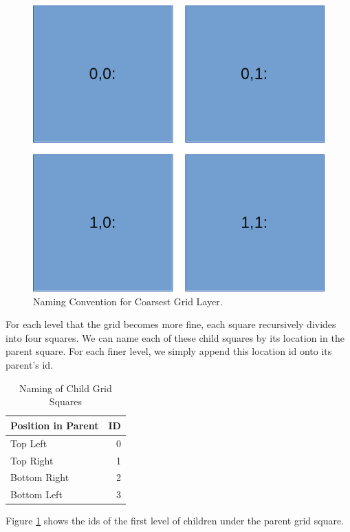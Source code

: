 \begin{figure}[htbp]
	\centering
	\includegraphics[width=0.6\columnwidth]{img/grid-sq.png}
	\caption{Naming Convention for Coarsest Grid Layer.}
	\label{fig:coarsest_grid_ids}
\end{figure}

For each level that the grid becomes more fine, each square recursively divides into four squares. We can name each of these child squares by its location in the parent square. For each finer level, we simply append this location id onto its parent's id.

\begin{table}[htbp]
	\caption{Naming of Child Grid Squares}
	\label{tab:grid_first_child}
	\begin{center}
		\begin{tabular}{|l|r|}
			\hline
			\textbf{Position in Parent} & \textbf{ID}\\
			\hline
			Top Left & 0\\
			\hline
			Top Right & 1\\
			\hline
			Bottom Right & 2\\
			\hline
			Bottom Left & 3\\
			\hline
		\end{tabular} 
	\end{center}
\end{table}

Figure \ref{fig:coarsest_grid_ids} shows the ids of the first level of children under the parent grid square.


